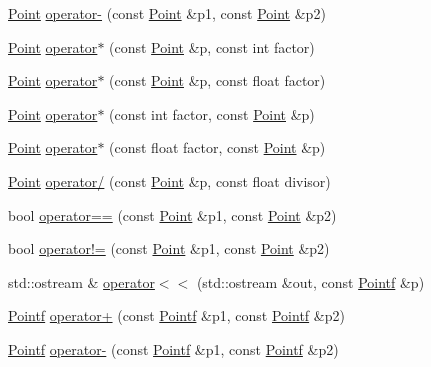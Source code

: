 \begin{DoxyCompactItemize}
\item 
\hyperlink{classprism_1_1_point}{Point} \hyperlink{namespaceprism_a505cbd94f024ad80136afe0b751da08a}{operator-\/} (const \hyperlink{classprism_1_1_point}{Point} \&p1, const \hyperlink{classprism_1_1_point}{Point} \&p2)
\item 
\hyperlink{classprism_1_1_point}{Point} \hyperlink{namespaceprism_a40976ce143923309d4c737bb8288d9e5}{operator$\ast$} (const \hyperlink{classprism_1_1_point}{Point} \&p, const int factor)
\item 
\hyperlink{classprism_1_1_point}{Point} \hyperlink{namespaceprism_a96e41c0858ff4149eafa1bc878dabb7c}{operator$\ast$} (const \hyperlink{classprism_1_1_point}{Point} \&p, const float factor)
\item 
\hyperlink{classprism_1_1_point}{Point} \hyperlink{namespaceprism_aa46a547ddc48425588986b0840d026a4}{operator$\ast$} (const int factor, const \hyperlink{classprism_1_1_point}{Point} \&p)
\item 
\hyperlink{classprism_1_1_point}{Point} \hyperlink{namespaceprism_a1ec2671f1e6c155a79740a8556baecc0}{operator$\ast$} (const float factor, const \hyperlink{classprism_1_1_point}{Point} \&p)
\item 
\hyperlink{classprism_1_1_point}{Point} \hyperlink{namespaceprism_a5f73aee33931e5b9977da32e50d47c0e}{operator/} (const \hyperlink{classprism_1_1_point}{Point} \&p, const float divisor)
\item 
bool \hyperlink{namespaceprism_a739baa4e75c1ca83624d486eec1d45e9}{operator==} (const \hyperlink{classprism_1_1_point}{Point} \&p1, const \hyperlink{classprism_1_1_point}{Point} \&p2)
\item 
bool \hyperlink{namespaceprism_a75cab41d882d24ca064927f2390ef3a6}{operator!=} (const \hyperlink{classprism_1_1_point}{Point} \&p1, const \hyperlink{classprism_1_1_point}{Point} \&p2)
\item 
std\+::ostream \& \hyperlink{namespaceprism_acad408bf2576dfc62a573cb44aa895fb}{operator$<$$<$} (std\+::ostream \&out, const \hyperlink{classprism_1_1_pointf}{Pointf} \&p)
\item 
\hyperlink{classprism_1_1_pointf}{Pointf} \hyperlink{namespaceprism_a64243aa2d4cf6ddb70526aaeda396f82}{operator+} (const \hyperlink{classprism_1_1_pointf}{Pointf} \&p1, const \hyperlink{classprism_1_1_pointf}{Pointf} \&p2)
\item 
\hyperlink{classprism_1_1_pointf}{Pointf} \hyperlink{namespaceprism_a435d5c45d873875f2c5092d102eddb78}{operator-\/} (const \hyperlink{classprism_1_1_pointf}{Pointf} \&p1, const \hyperlink{classprism_1_1_pointf}{Pointf} \&p2)

\end{DoxyCompactItemize}
